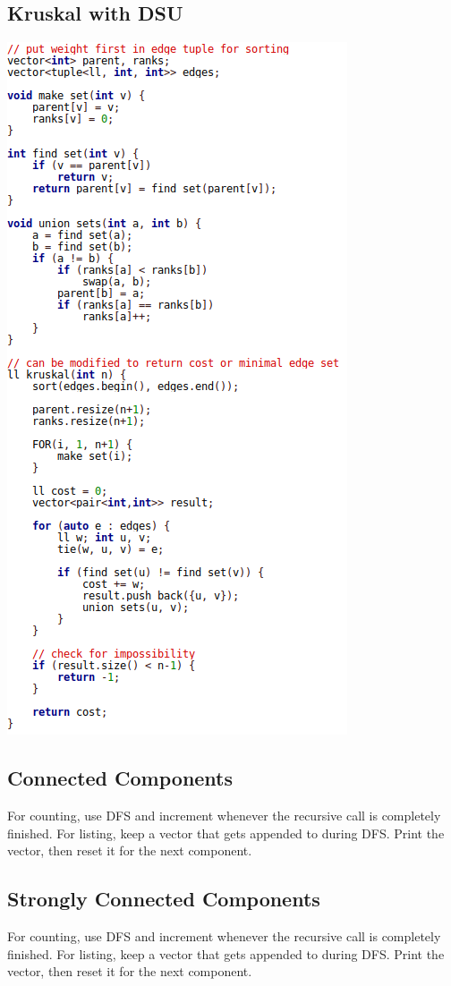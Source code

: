 \documentclass[11pt,twocolumn]{article}
\begin{document}
\subsection{Kruskal with DSU}
\includegraphics[scale=0.5]{kruskal}

\subsection{Connected Components}
For counting, use DFS and increment whenever the recursive call is completely finished. For listing, keep a vector that gets appended to during DFS. Print the vector, then reset it for the next component.

\subsection{Strongly Connected Components}
For counting, use DFS and increment whenever the recursive call is completely finished. For listing, keep a vector that gets appended to during DFS. Print the vector, then reset it for the next component.
\end{document}
